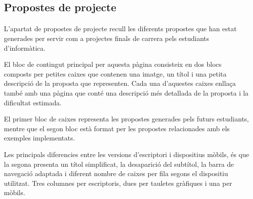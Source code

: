 \subsection{Propostes de projecte}

    \paragraph{}
    L'apartat de propostes de projecte recull les diferents propostes que han estat generades per servir com a projectes finals de carrera pels estudiants d'informàtica.

    El bloc de contingut principal per aquesta pàgina consisteix en dos blocs composts per petites caixes que contenen una imatge, un títol i una petita descripció de la proposta que representen. Cada una d'aquestes caixes enllaça també amb una pàgina que conté una descripció més detallada de la proposta i la dificultat estimada.

    El primer bloc de caixes representa les propostes generades pels futurs estudiants, mentre que el segon bloc està format per les propostes relacionades amb els exemples implementats.

    Les principals diferencies entre les versions d'escriptori i dispositius mòbils, és que la segona presenta un títol simplificat, la desaparició del subtítol, la barra de navegació adaptada i diferent nombre de caixes per fila segons el dispositiu utilitzat. Tres columnes per escriptoris, dues per tauletes gràfiques i una per mòbils.

